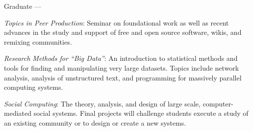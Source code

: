 \documentclass[10pt]{memoir}
\newenvironment{enumerate*}%
  {\begin{enumerate}%
    \setlength{\itemsep}{0pt}%
    \setlength{\parskip}{0pt}}%
  {\end{enumerate}}
\begin{document}
Graduate ---
\begin{enumerate*}
\item \emph{Topics in Peer Production}: Seminar on foundational work
  as well as recent advances in the study and support of free and open
  source software, wikis, and remixing communities.
\item \emph{Research Methods for ``Big Data''}: An introduction to
  statistical methods and tools for finding and manipulating very
  large datasets. Topics include network analysis, analysis of
  unstructured text, and programming for massively parallel computing
  systems.
\item \emph{Social Computing}: The theory, analysis, and design of
  large scale, computer-mediated social systems. Final projects will
  challenge students execute a study of an existing community or to
  design or create a new systems.
\end{enumerate*}
\end{document}
